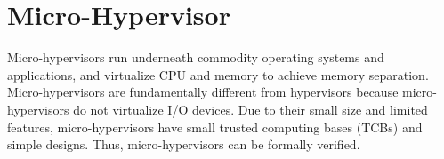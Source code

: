 \section{Micro-Hypervisor}
\label{sec:bg_mhv}

Micro-hypervisors run underneath commodity operating systems and applications, and virtualize CPU and memory to achieve memory separation. Micro-hypervisors are fundamentally different from hypervisors because micro-hypervisors do not virtualize I/O devices. Due to their small size and limited features, micro-hypervisors have small trusted computing bases (TCBs) and simple designs. Thus, micro-hypervisors can be formally verified.




